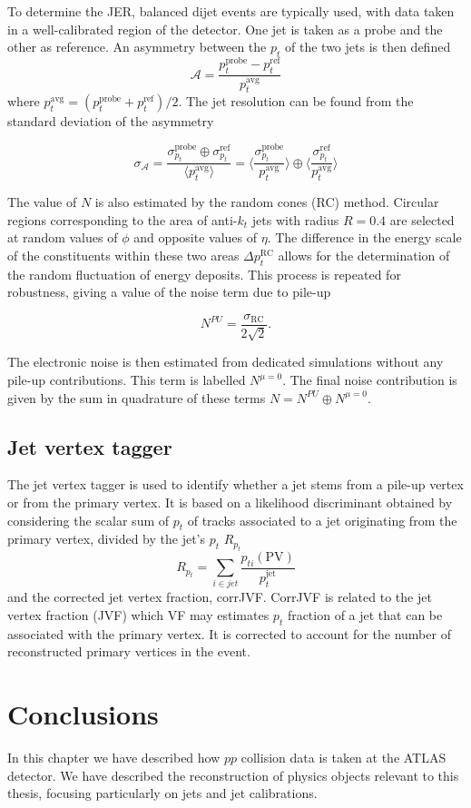 \documentclass[10pt,a4paper]{book}
\begin{document}
To determine the JER, balanced dijet events are typically used, with data taken in a well-calibrated region of the detector. One jet is taken as a probe and the other as reference. An asymmetry between the $p_t$ of the two jets is then defined
\begin{equation}
    \mathcal{A} = \frac{p_t^{\text{probe}} - p_t^{\text{ref}}}{p_t^{\text{avg}}}
\end{equation}
where $p_t^{\text{avg}} = (p_t^{\text{probe}} + p_t^{\text{ref}})/2$. The jet resolution can be found from the standard deviation of the asymmetry

\begin{equation}
    \sigma_\mathcal{A} = \frac{\sigma_{p_t}^\text{probe} \oplus \sigma_{p_t}^\text{ref}}{\langle p_t^{\text{avg}}\rangle} = \biggl \langle \frac{\sigma_{p_t}^\text{probe}}{p_t^{\text{avg}}} \biggl \rangle \oplus \biggl \langle\frac{\sigma_{p_t}^\text{ref}}{p_t^{\text{avg}}} \biggl \rangle
\end{equation}

The value of $N$ is also estimated by the random cones (RC) method. Circular regions corresponding to the area of anti-$k_t$ jets with radius $R=0.4$ are selected at random values of $\phi$ and opposite values of $\eta$. The difference in the energy scale of the constituents within these two areas $\Delta p_t^{\text{RC}}$ allows for the determination of the random fluctuation of energy deposits. This process is repeated for robustness, giving a value of the noise term due to pile-up

\begin{equation}
    N^{PU} = \frac{\sigma_{\text{RC}}}{2\sqrt{2}}.
\end{equation}

The electronic noise is then estimated from dedicated simulations without any pile-up contributions. This term is labelled $N^{\mu = 0}$. The final noise contribution is given by the sum in quadrature of these terms $N = N^{PU} \oplus N^{\mu=0}$.

\subsection{Jet vertex tagger}
The jet vertex tagger is used to identify whether a jet stems from a pile-up vertex or from the primary vertex. It is based on a likelihood discriminant obtained by considering the scalar sum of $p_t$ of tracks associated to a jet originating from the primary vertex, divided by the jet's $p_t$ $R_{p_t}$
\begin{equation}
    R_{p_t} = \sum_{i\in jet}\frac{p_{ti}(\text{PV})}{p_t^{\text{jet}}}
\end{equation}
and the corrected jet vertex fraction, corrJVF. CorrJVF is related to the jet vertex fraction (JVF) which VF may estimates $p_t$ fraction of a jet that can be associated with the primary vertex. It is corrected to account for the number of reconstructed primary vertices in the event.

\section{Conclusions}
In this chapter we have described how $pp$ collision data is taken at the ATLAS detector. We have described the reconstruction of physics objects relevant to this thesis, focusing particularly on jets and jet calibrations.
\end{document}
